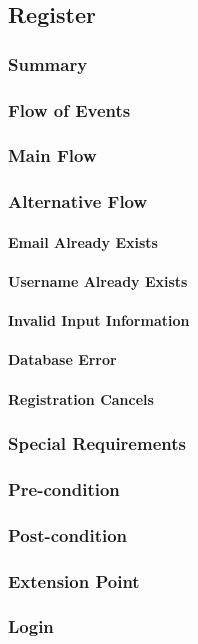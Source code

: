 \subsection{Register}
\subsubsection{Summary}

\subsubsection{Flow of Events}
\subsubsection*{Main Flow}

\subsubsection*{Alternative Flow}
\paragraph{Email Already Exists}

\paragraph{Username Already Exists}

\paragraph{Invalid Input Information}

\paragraph{Database Error}

\paragraph{Registration Cancels}

\subsubsection{Special Requirements}

\subsubsection{Pre-condition}

\subsubsection{Post-condition}

\subsubsection{Extension Point}

\subsubsection*{Login}